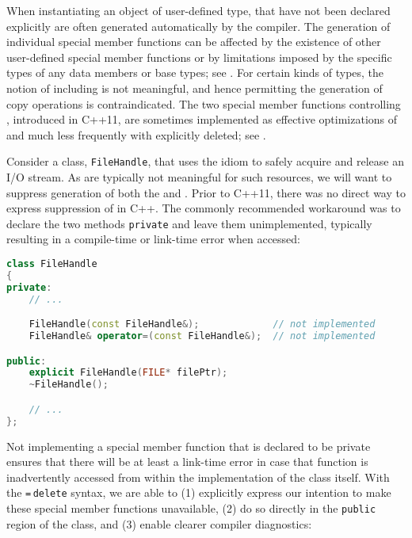 When instantiating an object of user-defined type,  that have not been declared explicitly are
often generated automatically by the compiler.
The generation of individual special member
functions can be affected by the existence of other user-defined special
member functions or by limitations imposed by the specific types of
any data members or base types; see 
. For certain kinds of types, the notion of  
including  is not meaningful, and
hence permitting the generation of copy operations is contraindicated. The two special member functions controlling , introduced in C++11, are sometimes implemented as effective optimizations of  and much less frequently with  explicitly deleted; see .

Consider a class, \lstinline!FileHandle!, that uses the  idiom
to safely acquire and release an I/O stream. As 
are typically not meaningful for such resources, we will want to
suppress generation of both the  and . Prior to C++11, there was no direct way to express
suppression of  in C++. The commonly
recommended workaround was to declare the two methods \lstinline!private!
and leave them unimplemented, typically resulting in a compile-time or
link-time error when accessed:

\begin{lstlisting}[language=C++]
class FileHandle
{
private:
    // ...

    FileHandle(const FileHandle&);             // not implemented
    FileHandle& operator=(const FileHandle&);  // not implemented

public:
    explicit FileHandle(FILE* filePtr);
    ~FileHandle();

    // ...
};
\end{lstlisting}
    
\noindent Not implementing a special member function that is declared to be private ensures that there will be at least a link-time error in case that function is inadvertently accessed from within the implementation of the class itself. With the \lstinline!=!\,\lstinline!delete! syntax, we are able to (1)
explicitly express our intention to make these special member
functions unavailable, (2) do so directly in the \lstinline!public! region
of the class, and (3) enable clearer compiler diagnostics:

